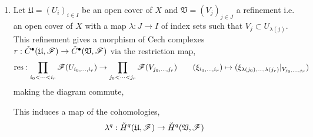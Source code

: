 \documentclass[12pt]{article}
\begin{document}
\renewcommand{\U}{\mathfrak{U}}
\newcommand{\V}{\mathfrak{V}}

\begin{enumerate}
\item Let $\U = (U_i)_{i \in I}$ be an open cover of $X$ and $\V = (V_j)_{j \in J}$ a refinement i.e. an open cover of $X$ with a map $\lambda : J \to I$ of index sets such that $V_{j} \subset U_{\lambda(j)}$.  This refinement gives a morphism of Cech complexes $r : \check{C}^\bullet(\U, \F) \to \check{C}^\bullet(\V, \F)$ via the restriction map,
\[ \mathrm{res} : \prod_{i_0 < \cdots < i_r} \mathscr{F}(U_{i_0, \dots, i_r}) \to \prod_{j_0 < \cdots < j_r} \mathscr{F}(V_{j_0, \dots, j_r}) \quad \quad (\xi_{i_0, \dots, i_r}) \mapsto (\xi_{\lambda(j_0), \dots, \lambda(j_r)} |_{V_{j_0, \dots, j_r}} ) \]
making the diagram commute,
\begin{center}
\end{center}
This induces a map of the cohomologies, 
\[ \lambda^q : \check{H}^q(\U, \F) \to \check{H}^q(\V, \F) \]


\end{enumerate}
\end{document}
